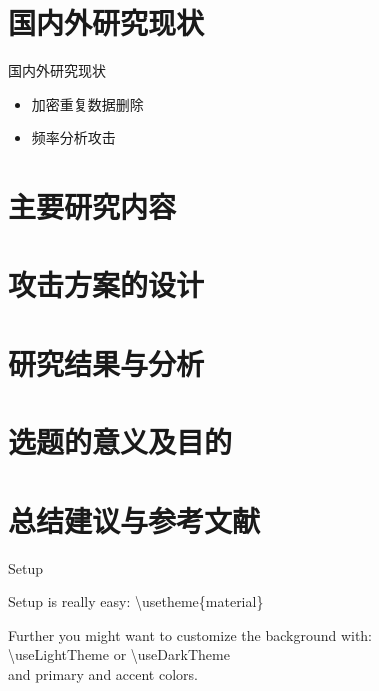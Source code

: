 \documentclass[aspectratio=43]{beamer}
\begin{document}
\section{国内外研究现状}

\begin{frame}{国内外研究现状}
\begin{card}
\begin{itemize}
    \item 加密重复数据删除
    \item 频率分析攻击
\end{itemize}
\end{card}
\end{frame}

\section{主要研究内容}

\section{攻击方案的设计}

\section{研究结果与分析}

\section{选题的意义及目的}

\section{总结建议与参考文献}


\begin{frame}{Setup}
\begin{card}
Setup is really easy: 
{\color{primary}\textbackslash usetheme\{material\}}
\end{card}
\begin{card}
Further you might want to customize the background with: \\[2mm]
{\color{primary}\textbackslash useLightTheme} or {\color{primary}\textbackslash useDarkTheme} \\[2mm]
and primary and accent colors.
\end{card}
\end{frame}
\end{document}
